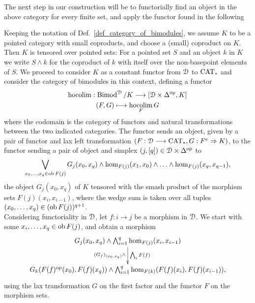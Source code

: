     The next step in our construction will be to functorially find an object in the above category for every finite set, and apply the functor found in the following
    \begin{defn}\label{def_hocolim}
      Keeping the notation of Def.~\ref{def_category_of_bimodules}, we assume $K$ to be a pointed category with small coproducts, and choose a (small) coproduct on $K$.
      Then $K$ is tensored over pointed sets: For a pointed set $S$ and an object $k$ in $K$ we write $S \wedge k$ for the coproduct of $k$ with itself over the non-basepoint elements of $S$.
      We proceed to consider $K$ as a constant functor from $\mathcal{D}$ to $\mathrm{CAT}_*$ and consider the category of bimodules in this context, defining a functor
      \begin{gather*}
        \operatorname*{hocolim}: \operatorname{Bimod}^{\mathcal{D}} / K \longrightarrow [\mathcal{D} \times \Delta^{\mathrm{op}}, K]\\
        (F,G) \longmapsto \operatorname*{hocolim}_F G
      \end{gather*}
      where the codomain is the category of functors and natural transformations between the two indicated categories.
      The functor sends an object, given by a pair of functor and lax left transformation $(F: \mathcal{D} \longrightarrow \mathrm{CAT}_*, G: F^e \Rightarrow K)$, to the functor sending a pair of object and simplex $(j,[q]) \in \mathcal{D} \times \Delta^\mathrm{op}$ to
      \begin{displaymath}
        \bigvee_{x_0, \ldots, x_q \in \ob F(j)} %
          G_j(x_0,x_q) \wedge %
          \hom_{F(j)}(x_1,x_0) \wedge \ldots \wedge \hom_{F(j)}(x_q,x_{q-1}),
      \end{displaymath}
      the object $G_j(x_0,x_q)$ of $K$ tensored with the smash product of the morphism sets $F(j)(x_i,x_{i-1})$, where the wedge sum is taken over all tuples $(x_0, \ldots, x_q) \in (\operatorname{ob} F(j))^{q+1}$.\\
      Considering functoriality in $\mathcal{D}$, let $f: i \to j$ be a morphism in $\mathcal{D}$.
      We start with some $x_i, \ldots, x_q \in \operatorname{ob} F(j)$, and obtain a morphism
      \begin{displaymath}
        \xymatrix{
          G_j(x_0,x_q) \wedge \bigwedge_{i=1}^q \hom_{F(j)}(x_i,x_{i-1}) %
            \ar[d]_{(G_f)_{(x_0,x_q)} \wedge}^{\bigwedge_i F(f)}
          \\
          G_k(F(f)^{\mathrm{op}}(x_0),F(f)(x_q)) \wedge %
            \bigwedge_{i=1}^q \hom_{F(k)}(F(f)(x_i),F(f)(x_{i-1})),  
        }
      \end{displaymath}
      using the lax transformation $G$ on the first factor and the functor $F$ on the morphism sets.

\end{defn}
